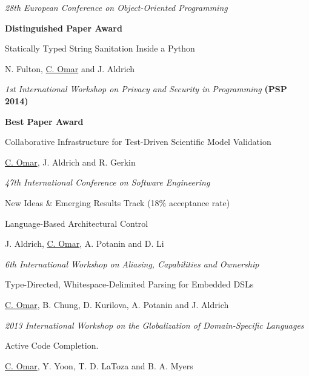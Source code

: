 \documentclass[10pt,letterpaper]{article}
\renewenvironment{itemize}{
  \begin{list}{}{
    \setlength{\leftmargin}{1.25em}
    \setlength{\itemsep}{0.25em}
    \setlength{\parskip}{0pt}
    \setlength{\parsep}{0.2em}
  }
}{
  \end{list}
}
\begin{document}
\begin{enumerate}[leftmargin=*, labelindent=6.5em, font=\bfseries]
\begin{itemize}
          \item \textit{28th European Conference on Object-Oriented Programming}
          \item \textbf{Distinguished Paper Award}
        \end{itemize}
  \item[PSP 2014] Statically Typed String Sanitation Inside a Python
        \begin{itemize}
          \item N. Fulton, \underline{C. Omar} and J. Aldrich
          \item \textit{1st International Workshop on Privacy and Security in Programming} {\textbf{(PSP 2014)}}
          \item \textbf{Best Paper Award}
        \end{itemize}
  \item[ICSE 2014] Collaborative Infrastructure for Test-Driven Scientific Model Validation
        \begin{itemize}
          \item \underline{C. Omar}, J. Aldrich and R. Gerkin
          \item \textit{47th International Conference on Software Engineering}
          \item New Ideas \& Emerging Results Track (18\% acceptance rate)
        \end{itemize}
  \item[IWACO 2014] Language-Based Architectural Control
        \begin{itemize}
          \item J. Aldrich, \underline{C. Omar}, A. Potanin and D. Li
          \item \textit{6th International Workshop on Aliasing, Capabilities and Ownership}
        \end{itemize}
  \item[GlobalDSL 2013] Type-Directed, Whitespace-Delimited Parsing for Embedded DSLs
        \begin{itemize}
          \item \underline{C. Omar}, B. Chung, D. Kurilova, A. Potanin and J. Aldrich
          \item \textit{2013 International Workshop on the Globalization of Domain-Specific Languages}
        \end{itemize}
  \item[ICSE 2012] {Active Code Completion}.
        \begin{itemize}
          \item \underline{C. Omar}, Y. Yoon, T. D. LaToza and B. A. Myers

\end{itemize}
\end{enumerate}
\end{document}
